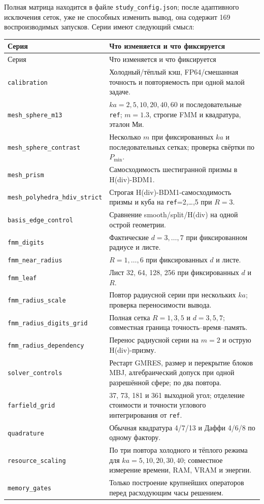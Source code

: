 \documentclass[12pt,a4paper]{article}
\begin{document}
Полная матрица находится в файле \texttt{study\_config.json}; после
адаптивного исключения сеток, уже не способных изменить вывод, она содержит
169 воспроизводимых запусков. Серии имеют следующий смысл:
\small
\begin{longtable}{>{\raggedright\arraybackslash}p{}p{}}
\toprule
Серия & Что изменяется и что фиксируется \\
\midrule
\endfirsthead
\toprule
Серия & Что изменяется и что фиксируется \\
\midrule
\endhead
\texttt{calibration} & Холодный/тёплый кэш, FP64/смешанная точность и повторяемость при одной малой задаче.\\
\texttt{mesh\_sphere\_m13} & $ka=2,5,10,20,40,60$ и последовательные \texttt{ref}; $m=1.3$, строгие FMM и квадратура, эталон Ми.\\
\texttt{mesh\_sphere\_contrast} & Несколько $m$ при фиксированных $ka$ и последовательных сетках; проверка свёртки по $P_{\min}$.\\
\texttt{mesh\_prism} & Самосходимость шестигранной призмы в H(div)-BDM1.\\
\texttt{mesh\_\allowbreak polyhedra\_\allowbreak hdiv\_\allowbreak strict} & Строгая H(div)-BDM1-самосходимость призмы и куба на \texttt{ref}=2,\ldots,5 при $R=3$.\\
\texttt{basis\_edge\_control} & Сравнение smooth/split/H(div) на одной острой геометрии.\\
\texttt{fmm\_digits} & Фактические $d=3,\ldots,7$ при фиксированном радиусе и листе.\\
\texttt{fmm\_near\_radius} & $R=1,\ldots,6$ при фиксированных $d$ и листе.\\
\texttt{fmm\_leaf} & Лист 32, 64, 128, 256 при фиксированных $d$ и $R$.\\
\texttt{fmm\_radius\_scale} & Повтор радиусной серии при нескольких $ka$; проверка переносимости вывода.\\
\texttt{fmm\_radius\_digits\_grid} & Полная сетка $R=1,3,5$ и $d=3,5,7$; совместная граница точность--время--память.\\
\texttt{fmm\_radius\_dependency} & Перенос радиусной серии на $m=2$ и острую H(div)-призму.\\
\texttt{solver\_controls} & Рестарт GMRES, размер и перекрытие блоков MBJ, алгебраический допуск при одной разрешённой сфере; по два повтора.\\
\texttt{farfield\_grid} & 37, 73, 181 и 361 выходной угол; отделение стоимости и точности углового интегрирования от \texttt{ref}.\\
\texttt{quadrature} & Обычная квадратура 4/7/13 и Даффи 4/6/8 по одному фактору.\\
\texttt{resource\_scaling} & По три повтора холодного и тёплого режима для $ka=5,10,20,30,40$; совместное измерение времени, RAM, VRAM и энергии.\\
\texttt{memory\_gates} & Только построение крупнейших операторов перед расходующим часы решением.\\
\bottomrule
\end{longtable}
\normalsize
\end{document}
